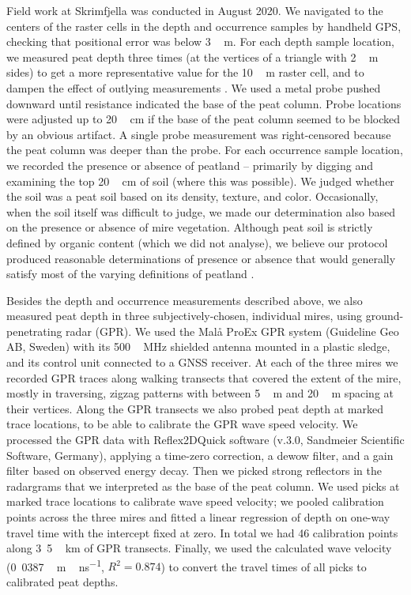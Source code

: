 \documentclass[soil, manuscript]{copernicus}
\begin{document}
Field work at Skrimfjella was conducted in August 2020.
We navigated to the centers of the raster cells in the depth and occurrence samples by handheld GPS, checking that positional error was below \unit{3\,m}.
For each depth sample location, we measured peat depth three times (at the vertices of a triangle with \unit{2\,m} sides) to get a more representative value for the \unit{10\,m} raster cell, and to dampen the effect of outlying measurements \citep{parryEvaluatingApproachesEstimating2014}.
We used a metal probe pushed downward until resistance indicated the base of the peat column.
Probe locations were adjusted up to \unit{20\,cm} if the base of the peat column seemed to be blocked by an obvious artifact.
A single probe measurement was right-censored because the peat column was deeper than the probe.
For each occurrence sample location, we recorded the presence or absence of peatland -- primarily by digging and examining the top \unit{20\,cm} of soil (where this was possible).
We judged whether the soil was a peat soil based on its density, texture, and color.
Occasionally, when the soil itself was difficult to judge, we made our determination also based on the presence or absence of mire vegetation.
Although peat soil is strictly defined by organic content (which we did not analyse), we believe our protocol produced reasonable determinations of presence or absence that would generally satisfy most of the varying definitions of peatland \citep{minasnyMappingMonitoringPeatland2023}.

Besides the depth and occurrence measurements described above, we also measured peat depth in three subjectively-chosen, individual mires, using ground-penetrating radar (GPR).
We used the Malå ProEx GPR system (Guideline Geo AB, Sweden) with its \unit{500\,MHz} shielded antenna mounted in a plastic sledge, and its control unit connected to a GNSS receiver.
At each of the three mires we recorded GPR traces along walking transects that covered the extent of the mire, mostly in traversing, zigzag patterns with between \unit{5\,m} and \unit{20\,m} spacing at their vertices.
Along the GPR transects we also probed peat depth at marked trace locations, to be able to calibrate the GPR wave speed velocity.
We processed the GPR data with Reflex2DQuick software (v.3.0, Sandmeier Scientific Software, Germany), applying a time-zero correction, a dewow filter, and a gain filter based on observed energy decay.
Then we picked strong reflectors in the radargrams that we interpreted as the base of the peat column.
We used picks at marked trace locations to calibrate wave speed velocity; we pooled calibration points across the three mires and fitted a linear regression of depth on one-way travel time with the intercept fixed at zero.
In total we had 46 calibration points along \unit{3.5\,km} of GPR transects.
Finally, we used the calculated wave velocity (\unit{0.0387\,m\,ns^{-1}}, \(R^2 = 0.874\)) to convert the travel times of all picks to calibrated peat depths.
\end{document}
